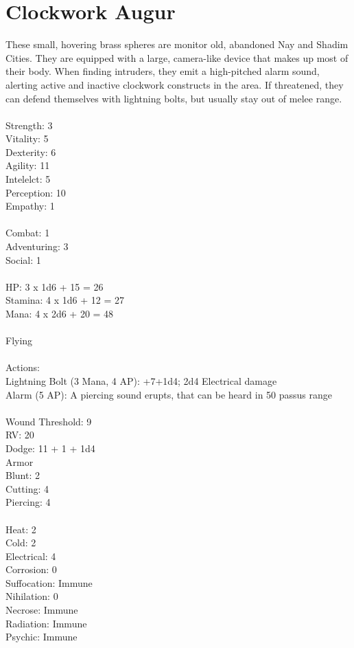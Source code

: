\pagebreak
\section{Clockwork Augur}

These small, hovering brass spheres are monitor old, abandoned Nay and Shadim Cities. They are equipped with a large, camera-like device that makes up most of their body. When finding intruders, they emit a high-pitched alarm sound, alerting active and inactive clockwork constructs in the area. If threatened, they can defend themselves with lightning bolts, but usually stay out of melee range.\\
\\
Strength: 3\\
Vitality: 5\\
Dexterity: 6\\
Agility: 11\\
Intelelct: 5\\
Perception: 10\\
Empathy: 1\\
\\
Combat: 1\\
Adventuring: 3\\
Social: 1\\
\\
HP: 3 x 1d6 + 15 = 26\\
Stamina: 4 x 1d6 + 12 = 27\\
Mana: 4 x 2d6 + 20 = 48\\
\\
Flying\\
\\
Actions:\\
Lightning Bolt (3 Mana, 4 AP): +7+1d4; 2d4 Electrical damage\\
Alarm (5 AP): A piercing sound erupts, that can be heard in 50 passus range\\
\\
Wound Threshold: 9\\
RV: 20\\
Dodge: 11 + 1 + 1d4\\
Armor\\
Blunt: 2\\
Cutting: 4\\
Piercing: 4\\
\\
Heat: 2\\
Cold: 2\\
Electrical: 4\\
Corrosion: 0\\
Suffocation: Immune\\
Nihilation: 0\\
Necrose: Immune\\
Radiation: Immune\\
Psychic: Immune\\